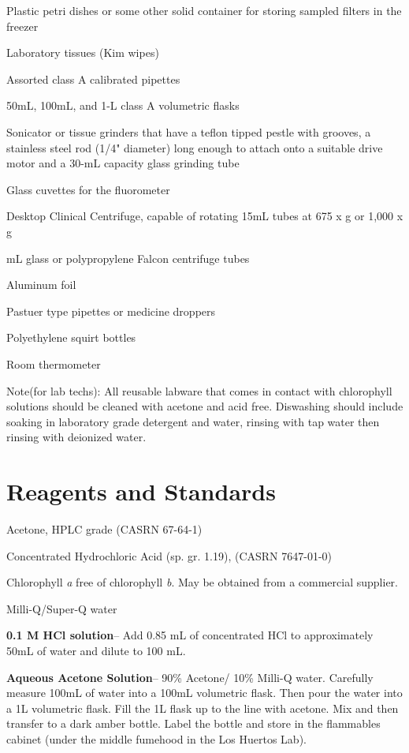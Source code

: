 \documentclass[12pt]{../SOP3}\usepackage[]{graphicx}\usepackage[]{color}
\begin{document}
\NP Plastic petri dishes or some other solid container for storing sampled filters in the freezer

\NP Laboratory tissues (Kim wipes)

\NP Assorted class A calibrated pipettes 

\NP 50mL, 100mL, and 1-L class A volumetric flasks

\NP Sonicator or tissue grinders that have a teflon tipped pestle with grooves, a stainless steel rod (1/4" diameter) long enough to attach onto a suitable drive motor and a 30-mL capacity glass grinding tube

\NP Glass cuvettes for the fluorometer

\NP Desktop Clinical Centrifuge, capable of rotating 15mL tubes at 675 x g or 1,000 x g 

 mL glass or polypropylene Falcon centrifuge tubes

\NP Aluminum foil

\NP Pastuer type pipettes or medicine droppers

\NP Polyethylene squirt bottles

\NP Room thermometer

\NP Note(for lab techs): All reusable labware that comes in contact with chlorophyll solutions should be cleaned with acetone and acid free. Diswashing should include soaking in laboratory grade detergent and water, rinsing with tap water then rinsing with deionized water. 

\section{Reagents and Standards}
\NP Acetone, HPLC grade (CASRN 67-64-1)

\NP Concentrated Hydrochloric Acid (sp. gr. 1.19), (CASRN 7647-01-0)

\NP Chlorophyll \textit{a} free of chlorophyll \textit{b}. May be obtained from a commercial supplier.

\NP Milli-Q/Super-Q water

\NP \textbf{0.1 M HCl solution}-- Add 0.85 mL of concentrated HCl to approximately 50mL of water and dilute to 100 mL. 

\NP \textbf{Aqueous Acetone Solution}-- 90\% Acetone/ 10\% Milli-Q water. Carefully measure 100mL of water into a 100mL volumetric flask. Then pour the water into a 1L volumetric flask. Fill the 1L flask up to the line with acetone. Mix and then transfer to a dark amber bottle. Label the bottle and store in the flammables cabinet (under the middle fumehood in the Los Huertos Lab). 
\end{document}
